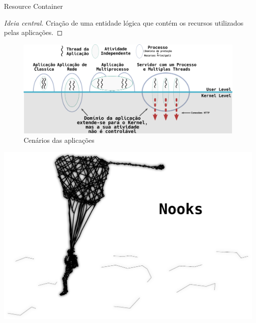 \documentclass[xcolor={usenames,svgnames,dvipsnames},brazil,english,12pt,aspectratio=149]{beamer}
\begin{document}
\begin{frame}{Resource Container}

  \begin{proof}[Ideia central]
Criação de uma entidade lógica que contém os recursos utilizados pelas aplicações.
  \end{proof}

  \begin{figure}[!h]
    \centering
    \includegraphics[width=.8\textwidth]{resource_constainer_scenarios} 
    \caption*{Cenários das aplicações}
  \end{figure}

\end{frame}

\begin{frame}[plain]
  \includegraphics[width=\textwidth]{presentation_cap2_five}
\end{frame}
\end{document}
